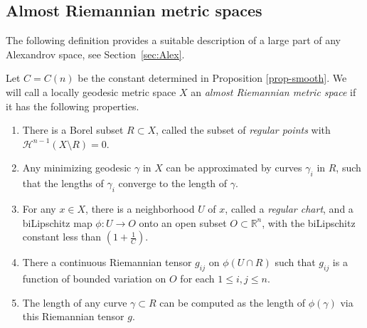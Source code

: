 \documentclass[12pt,leqno]{amsart}
\numberwithin{equation}{section}
\theoremstyle{definition}
\theoremstyle{remark}
\newcommand{\R}{\mathbb{R}}
\def\co{\colon\thinspace}
\begin{document}


\subsection{Almost Riemannian metric spaces}
The following definition provides a suitable description of a  large part of any Alexandrov space, see Section~\ref{sec:Alex}.

 Let  $C =C(n)$ be the constant determined in  Proposition \ref{prop-smooth}. We will call  a locally geodesic metric space
 $X$ an \emph{almost Riemannian metric space}  if it has the following properties.
 \begin{enumerate}
 \item  There is   a Borel subset $R\subset X$, called the subset of \emph{regular points} with $\mathcal H^{n-1} (X\setminus R)=0$.
 \item Any   minimizing geodesic $\gamma$ in $X$ can be approximated by curves $\gamma _i$ in $R$, such that the lengths of $\gamma _i$ converge to the length of  $\gamma$.
\item For any  $x\in X$, there is a neighborhood $U$ of $x$, called a \emph{regular chart}, and  a biLipschitz map
$\phi:U\to O$ onto an open subset $O\subset \R^n$, with the biLipschitz constant less than $(1+\frac 1 C)$.
 \item There a continuous Riemannian tensor $g_{ij} $ on $\phi (U\cap R)$ such that $g_{ij}$ is a  function of bounded variation on $O$
for each $1\leq i,j \leq n$.
 \item The length of any curve $\gamma \subset R$ can be computed as the length of $\phi (\gamma )$ via this Riemannian tensor $g$.
\end{enumerate}
\end{document}
